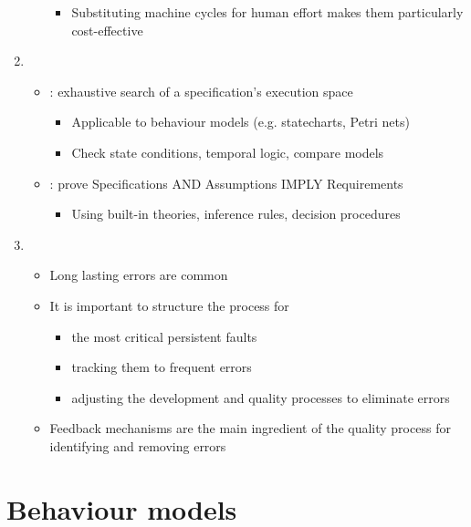 \begin{enumerate}
\begin{itemize}
\begin{itemize}
            \item Substituting machine cycles for human effort makes them particularly cost-effective
        \end{itemize}
    \end{itemize}
        \item {}
    \begin{itemize}
        \item {} : exhaustive search of a specification's execution space
        \begin{itemize}
            \item Applicable to behaviour models (e.g. statecharts, Petri nets)
            \item Check state conditions, temporal logic, compare models
        \end{itemize}
        \item {} : prove Specifications AND Assumptions IMPLY Requirements
        \begin{itemize}
            \item Using built-in theories, inference rules, decision procedures
        \end{itemize}
    \end{itemize}
    \item {}
    \begin{itemize}
        \item Long lasting errors are common
        \item It is important to structure the process for
        \begin{itemize}
            \item the most critical persistent faults
            \item tracking them to frequent errors
            \item adjusting the development and quality processes to eliminate errors
        \end{itemize}
        \item Feedback mechanisms are the main ingredient of the quality process for identifying and removing errors
    \end{itemize}
\end{enumerate}

\chapter{Behaviour models}

